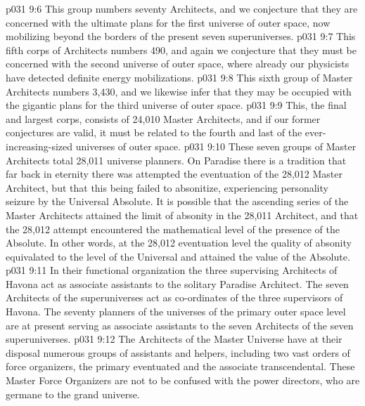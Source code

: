 \vs p031 9:6 \pc {}\bibnobreakspace {} This group numbers seventy Architects, and we conjecture that they are concerned with the ultimate plans for the first universe of outer space, now mobilizing beyond the borders of the present seven superuniverses.
\vs p031 9:7 \pc {}\bibnobreakspace {} This fifth corps of Architects numbers 490, and again we conjecture that they must be concerned with the second universe of outer space, where already our physicists have detected definite energy mobilizations.
\vs p031 9:8 \pc {}\bibnobreakspace {} This sixth group of Master Architects numbers 3,430, and we likewise infer that they may be occupied with the gigantic plans for the third universe of outer space.
\vs p031 9:9 \pc {}\bibnobreakspace {} This, the final and largest corps, consists of 24,010 Master Architects, and if our former conjectures are valid, it must be related to the fourth and last of the ever\hyp{}increasing\hyp{}sized universes of outer space.
\vs p031 9:10 \pc These seven groups of Master Architects total 28,011 universe planners. On Paradise there is a tradition that far back in eternity there was attempted the eventuation of the 28,012 Master Architect, but that this being failed to absonitize, experiencing personality seizure by the Universal Absolute. It is possible that the ascending series of the Master Architects attained the limit of absonity in the 28,011 Architect, and that the 28,012 attempt encountered the mathematical level of the presence of the Absolute. In other words, at the 28,012 eventuation level the quality of absonity equivalated to the level of the Universal and attained the value of the Absolute.
\vs p031 9:11 \pc In their functional organization the three supervising Architects of Havona act as associate assistants to the solitary Paradise Architect. The seven Architects of the superuniverses act as co\hyp{}ordinates of the three supervisors of Havona. The seventy planners of the universes of the primary outer space level are at present serving as associate assistants to the seven Architects of the seven superuniverses.
\vs p031 9:12 The Architects of the Master Universe have at their disposal numerous groups of assistants and helpers, including two vast orders of force organizers, the primary eventuated and the associate transcendental. These Master Force Organizers are not to be confused with the power directors, who are germane to the grand universe.
